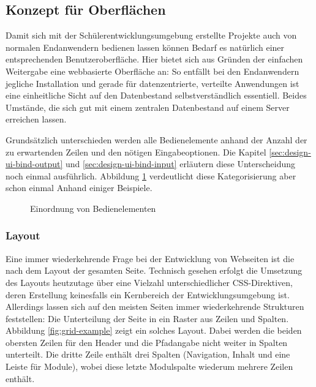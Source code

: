 \subsection{Konzept für Oberflächen}
\label{sec:design-ui-concept}


Damit sich mit der Schülerentwicklungsumgebung erstellte Projekte auch von normalen Endanwendern bedienen lassen können Bedarf es natürlich einer entsprechenden Benutzeroberfläche. Hier bietet sich aus Gründen der einfachen Weitergabe eine webbasierte Oberfläche an: So entfällt bei den Endanwendern jegliche Installation und gerade für datenzentrierte, verteilte Anwendungen ist eine einheitliche Sicht auf den Datenbestand selbstverständlich essentiell. Beides Umstände, die sich gut mit einem zentralen Datenbestand auf einem Server erreichen lassen.

Grundsätzlich unterschieden werden alle Bedienelemente anhand der Anzahl der zu erwartenden Zeilen und den nötigen Eingabeoptionen. Die Kapitel \ref{sec:design-ui-bind-output}  und \ref{sec:design-ui-bind-input}  erläutern diese Unterscheidung noch einmal ausführlich. Abbildung \ref{fig:ui-element-concept} verdeutlicht diese Kategorisierung aber schon einmal Anhand einiger Beispiele.

\begin{figure}[p]
  \centering 
  \caption{Einordnung von Bedienelementen}
  \label{fig:ui-element-concept}
\end{figure}

\subsubsection{Layout}

Eine immer wiederkehrende Frage bei der Entwicklung von Webseiten ist die nach dem Layout der gesamten Seite. Technisch gesehen erfolgt die Umsetzung des Layouts heutzutage über eine Vielzahl unterschiedlicher CSS-Direktiven, deren Erstellung keinesfalls ein Kernbereich der Entwicklungsumgebung ist. Allerdings lassen sich auf den meisten Seiten immer wiederkehrende Strukturen feststellen: Die Unterteilung der Seite in ein Raster aus Zeilen und Spalten. Abbildung \ref{fig:grid-example} zeigt ein solches Layout. Dabei werden die beiden obersten Zeilen für den Header und die Pfadangabe nicht weiter in Spalten unterteilt. Die dritte Zeile enthält drei Spalten (Navigation, Inhalt und eine Leiste für Module), wobei diese letzte Modulspalte wiederum mehrere Zeilen enthält.

